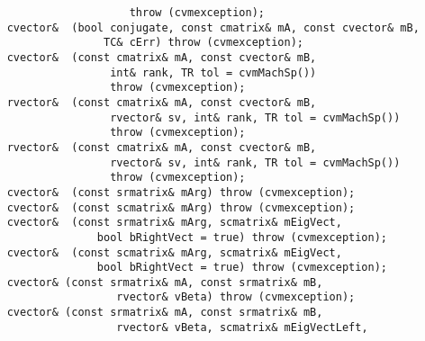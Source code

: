 \verb"                       throw (cvmexception);"\\
\verb"    cvector& "\verb" (bool conjugate, const cmatrix& mA, const cvector& mB,"\\
\verb"                   TC& cErr) throw (cvmexception);"\\
\verb"    cvector& "\verb" (const cmatrix& mA, const cvector& mB,"\\
\verb"                    int& rank, TR tol = cvmMachSp())"\\
\verb"                    throw (cvmexception);"\\
\verb"    rvector& "\verb" (const cmatrix& mA, const cvector& mB,"\\
\verb"                    rvector& sv, int& rank, TR tol = cvmMachSp())"\\
\verb"                    throw (cvmexception);"\\
\verb"    rvector& "\verb" (const cmatrix& mA, const cvector& mB,"\\
\verb"                    rvector& sv, int& rank, TR tol = cvmMachSp())"\\
\verb"                    throw (cvmexception);"\\
\verb"    cvector& "\verb" (const srmatrix& mArg) throw (cvmexception);"\\
\verb"    cvector& "\verb" (const scmatrix& mArg) throw (cvmexception);"\\
\verb"    cvector& "\verb" (const srmatrix& mArg, scmatrix& mEigVect,"\\
\verb"                  bool bRightVect = true) throw (cvmexception);"\\
\verb"    cvector& "\verb" (const scmatrix& mArg, scmatrix& mEigVect,"\\
\verb"                  bool bRightVect = true) throw (cvmexception);"\\
\verb"    cvector& "\verb"(const srmatrix& mA, const srmatrix& mB,"\\
\verb"                     rvector& vBeta) throw (cvmexception);"\\
\verb"    cvector& "\verb"(const srmatrix& mA, const srmatrix& mB,"\\
\verb"                     rvector& vBeta, scmatrix& mEigVectLeft,"\\
